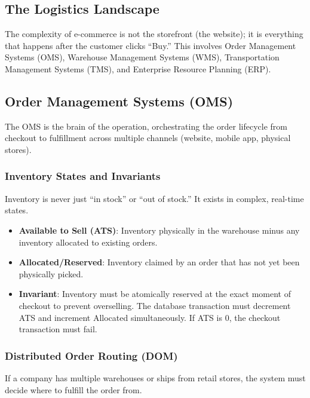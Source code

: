 \documentclass[
  11pt,
  openany,
  oneside]{book}
\providecommand{\tightlist}{%
  \setlength{\itemsep}{0pt}\setlength{\parskip}{0pt}}
\begin{document}
\subsection{The Logistics Landscape}\label{the-logistics-landscape}

The complexity of e-commerce is not the storefront (the website); it is
everything that happens after the customer clicks ``Buy.'' This involves
Order Management Systems (OMS), Warehouse Management Systems (WMS),
Transportation Management Systems (TMS), and Enterprise Resource
Planning (ERP).

\subsection{Order Management Systems
(OMS)}\label{order-management-systems-oms}

The OMS is the brain of the operation, orchestrating the order lifecycle
from checkout to fulfillment across multiple channels (website, mobile
app, physical stores).

\subsubsection{Inventory States and
Invariants}\label{inventory-states-and-invariants}

Inventory is never just ``in stock'' or ``out of stock.'' It exists in
complex, real-time states.

\begin{itemize}
\tightlist
\item
  \textbf{Available to Sell (ATS)}: Inventory physically in the
  warehouse minus any inventory allocated to existing orders.
\item
  \textbf{Allocated/Reserved}: Inventory claimed by an order that has
  not yet been physically picked.
\item
  \textbf{Invariant}: Inventory must be atomically reserved at the exact
  moment of checkout to prevent overselling. The database transaction
  must decrement ATS and increment Allocated simultaneously. If ATS is
  0, the checkout transaction must fail.
\end{itemize}

\subsubsection{Distributed Order Routing
(DOM)}\label{distributed-order-routing-dom}

If a company has multiple warehouses or ships from retail stores, the
system must decide where to fulfill the order from.
\end{document}
